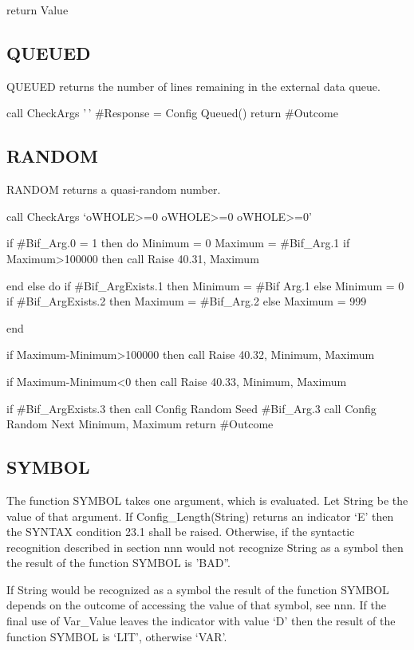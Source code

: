 return Value

\subsection{QUEUED}\label{queued-1}

QUEUED returns the number of lines remaining in the external data queue.

call CheckArgs '\,' \#Response = Config Queued() return \#Outcome

\subsection{RANDOM}\label{random-1}

RANDOM returns a quasi-random number.

call CheckArgs `oWHOLE\textgreater=0 oWHOLE\textgreater=0
oWHOLE\textgreater=0'

if \#Bif\_Arg.0 = 1 then do Minimum = 0 Maximum = \#Bif\_Arg.1 if
Maximum\textgreater100000 then call Raise 40.31, Maximum

end else do if \#Bif\_ArgExists.1 then Minimum = \#Bif Arg.1 else
Minimum = 0 if \#Bif\_ArgExists.2 then Maximum = \#Bif\_Arg.2 else
Maximum = 999

end

if Maximum-Minimum\textgreater100000 then call Raise 40.32, Minimum,
Maximum

if Maximum-Minimum\textless0 then call Raise 40.33, Minimum, Maximum

if \#Bif\_ArgExists.3 then call Config Random Seed \#Bif\_Arg.3 call
Config Random Next Minimum, Maximum return \#Outcome

\subsection{SYMBOL}\label{symbol-1}

The function SYMBOL takes one argument, which is evaluated. Let String
be the value of that argument. If Config\_Length(String) returns an
indicator `E' then the SYNTAX condition 23.1 shall be raised. Otherwise,
if the syntactic recognition described in section nnn would not
recognize String as a symbol then the result of the function SYMBOL is
'BAD''.

If String would be recognized as a symbol the result of the function
SYMBOL depends on the outcome of accessing the value of that symbol, see
nnn. If the final use of Var\_Value leaves the indicator with value `D'
then the result of the function SYMBOL is `LIT', otherwise `VAR'.

